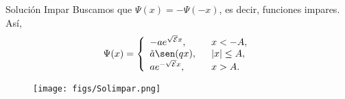 \documentclass[aspectratio=1610]{beamer}
\begin{document}
\begin{frame}{Solución Impar}
Buscamos que $\Psi(x) = - \Psi(-x)$, es decir, funciones impares. Así, 
\begin{align}
        \Psi(x) = 
        \left\{ \begin{array}{ll}
        -ae^{\sqrt{\mathcal{E}}x},& \:\:\:  x < -A,
        \\
        \Tilde{a}\sen(qx), & \:\:\: |x| \leq A,
        \\
        ae^{-\sqrt{\mathcal{E}}x},& \:\:\: x > A.
        \end{array}
        \right.
        \label{eq:Solimpar}
\end{align}
\begin{figure}[h]
    \centering
    \texttt{[image: figs/Solimpar.png]}
\end{figure}
    
\begin{columns}
\column{37em}
\end{columns}
\end{frame}
\end{document}
